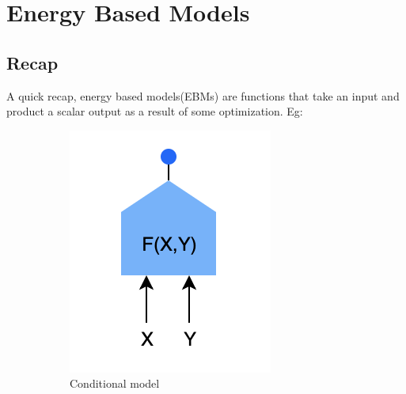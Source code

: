 \chapter{Energy Based Models}

\section{Recap}

A quick recap, energy based models(EBMs) are functions that take an input and product a scalar output as a result of some optimization.
Eg:

\begin{figure}[!htb]	
    \centering	
    \begin{subfigure}[b]{0.25\textwidth}	
        \includegraphics[width=\textwidth]{figs/conditional_EBM.png}	
        \caption{Conditional model}	
        \label{fig:8a_conditional}	
    \end{subfigure}	
    \begin{subfigure}[b]{0.25\textwidth}	

\end{subfigure}
\end{figure}
